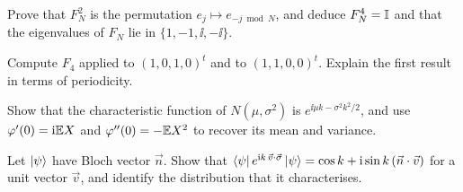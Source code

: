 \begin{exerciseset}
   Prove that $F_N^2$ is the permutation $e_j\mapsto e_{-j\bmod N}$, and deduce $F_N^4=\mathbb{I}$ and that the eigenvalues of $F_N$ lie in $\{1,-1,\ii,-\ii\}$.

   Compute $F_4$ applied to $(1,0,1,0)^t$ and to $(1,1,0,0)^t$. Explain the first result in terms of periodicity.

   Show that the characteristic function of $N(\mu,\sigma^2)$ is $e^{\ii\mu k-\sigma^2k^2/2}$, and use $\varphi'(0)=\mathrm{i}\mathbb{E} X$ and $\varphi''(0)=-\mathbb{E} X^2$ to recover its mean and variance.

   Let $\left|\psi\right\rangle$ have Bloch vector $\vec n$. Show that $\left\langle\psi\right| e^{\mathrm{i} k\,\vec v\cdot\vec\sigma}\left|\psi\right\rangle=\cos k+\mathrm{i}\sin k\,(\vec n\cdot\vec v)$ for a unit vector $\vec v$, and identify the distribution that it characterises.
\end{exerciseset}
